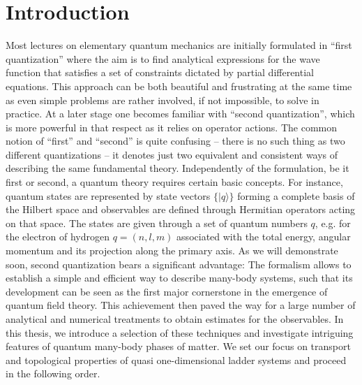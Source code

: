 %
\chapter*{Introduction}
%
Most lectures on elementary quantum mechanics are initially formulated in ``first quan\-ti\-zation'' where the aim is to find analytical expressions for the wave function that satisfies a set of constraints dictated by partial differential equations.
This approach can be both beautiful and frustrating at the same time as even simple problems are rather involved, if not impossible, to solve in practice.
At a later stage one becomes familiar with ``second quantization'', which is more powerful in that respect as it relies on operator actions.
The common notion of ``first'' and ``second'' is quite confusing -- there is no such thing as two different quantizations -- it denotes just two equivalent and consistent ways of describing the same fundamental theory.
Independently of the formulation, be it first or second, a quantum theory requires certain basic concepts.
For instance, quantum states are represented by state vectors $\{|q\rangle\}$ forming a complete basis of the Hilbert space and observables are defined through Hermitian operators acting on that space.
The states are given through a set of quantum numbers $q$, e.g. for the electron of hydrogen $q=(n,l,m)$ associated with the total energy, angular momentum and its projection along the primary axis.
As we will demonstrate soon, second quantization bears a significant advantage: The formalism allows to establish a simple and efficient way to describe many-body systems, such that its development can be seen as the first major cornerstone in the emergence of quantum field theory.
This achievement then paved the way for a large number of analytical and numerical treatments to obtain estimates for the observables.
In this thesis, we introduce a selection of these techniques and investigate intriguing features of quantum many-body phases of matter.
We set our focus on transport and topological properties of quasi one-dimensional ladder systems and proceed in the following order.

